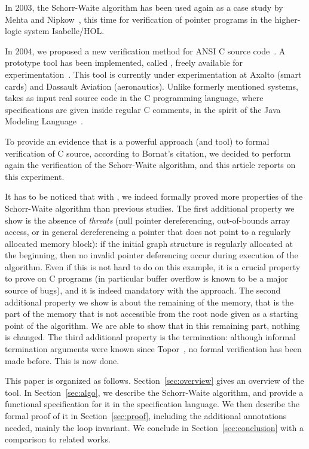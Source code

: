 
In 2003, the Schorr-Waite algorithm has been used again as a case
study by Mehta and Nipkow~\cite{mehta03cade}, this time for
verification of pointer programs in the higher-logic system
Isabelle/HOL. 

In 2004, we proposed a new verification method for ANSI
C source code~\cite{filliatre04icfem}.  A prototype tool has been
implemented, called \caduceus{}, freely available for
experimentation~\cite{Caduceus}. This tool is currently under
experimentation at Axalto (smart cards) and Dassault Aviation
(aeronautics). Unlike formerly mentioned systems, \caduceus{} takes as
input real source code in the C programming language, where
specifications are given inside regular C comments, in the spirit of
the Java Modeling Language~\cite{leavens00jml}. 

To provide an evidence that \caduceus{} is a powerful approach (and
tool) to formal verification of C source, according to Bornat's
citation, we decided to perform again the verification of the
Schorr-Waite algorithm, and this article reports
on this experiment.

It has to be noticed that with \caduceus{}, we indeed formally proved
more properties of the Schorr-Waite algorithm than previous studies.
The first additional property we show is the absence of \emph{threats}
(null pointer dereferencing, out-of-bounds array access, or in general
dereferencing a pointer that does not point to a regularly allocated
memory block): if the initial graph structure is regularly allocated
at the beginning, then no invalid pointer deferencing occur during
execution of the algorithm. Even if this is not hard to do on this
example, it is a crucial property to prove on C programs (in
particular buffer overflow is known to be a major source of bugs), and
it is indeed mandatory with the \caduceus{} approach. The second
additional property we show is about the remaining of the memory, that
is the part of the memory that is not accessible from the root node
given as a starting point of the algorithm. We are able to show that
in this remaining part, nothing is changed. The third additional
property is the termination: although informal termination arguments
were known since Topor~\cite{topor79acta}, %
no formal
verification has been made before. This is now done.

This paper is organized as follows.  Section~\ref{sec:overview} gives
an overview of the \caduceus{} tool.  In Section~\ref{sec:algo}, we
describe the Schorr-Waite algorithm, and provide a functional
specification for it in the \caduceus{} specification language.
We then describe the formal proof of it in Section~\ref{sec:proof},
including the additional annotations needed, mainly the loop
invariant.  We conclude in Section~\ref{sec:conclusion} with a
comparison to related works. 





